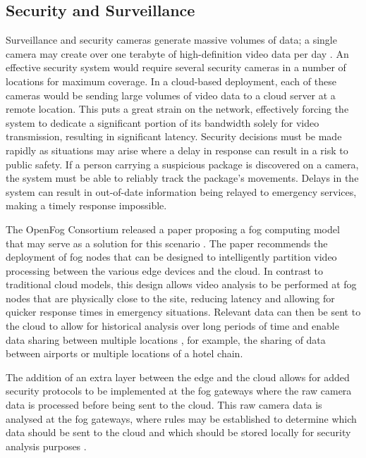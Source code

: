 \documentclass{article}
\begin{document}
\subsection{Security and Surveillance}
Surveillance and security cameras generate massive volumes of data; a single camera may create over one terabyte of high-definition video data per day \cite{openfogconsortium2017visualsecurity}. An effective security system would require several security cameras in a number of locations for maximum coverage. In a cloud-based deployment, each of these cameras would be sending large volumes of video data to a cloud server at a remote location. This puts a great strain on the network, effectively forcing the system to dedicate a significant portion of its bandwidth solely for video transmission, resulting in significant latency. Security decisions must be made rapidly as situations may arise where a delay in response can result in a risk to public safety. If a person carrying a suspicious package is discovered on a camera, the system must be able to reliably track the package's movements. Delays in the system can result in out-of-date information being relayed to emergency services, making a timely response impossible.

The OpenFog Consortium released a paper proposing a fog computing model that may serve as a solution for this scenario \cite{openfogconsortium2017visualsecurity}. The paper recommends the deployment of fog nodes that can be designed to intelligently partition video processing between the various edge devices and the cloud. In contrast to traditional cloud models, this design allows video analysis to be performed at fog nodes that are physically close to the site, reducing latency and allowing for quicker response times in emergency situations. Relevant data can then be sent to the cloud to allow for historical analysis over long periods of time and enable data sharing between multiple locations \cite{openfogconsortium2017visualsecurity}, for example, the sharing of data between airports or multiple locations of a hotel chain.

The addition of an extra layer between the edge and the cloud allows for added security protocols to be implemented at the fog gateways where the raw camera data is processed before being sent to the cloud. This raw camera data is analysed at the fog gateways, where rules may be established to determine which data should be sent to the cloud and which should be stored locally for security analysis purposes \cite{openfogconsortium2017visualsecurity}.
\end{document}
